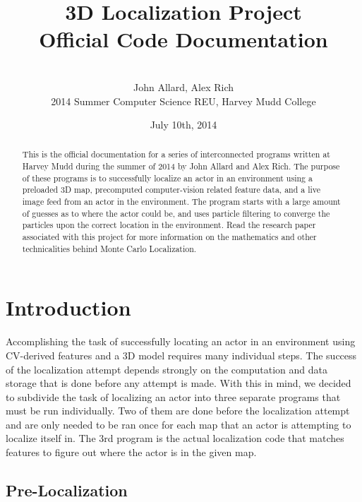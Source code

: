\documentclass[a4paper,11pt]{article}
\title{3D Localization Project \\ Official Code Documentation}
\author{ \\[6.5in]  John Allard, Alex Rich \\ 2014 Summer Computer Science REU, Harvey Mudd College}
\date{July 10th, 2014}
\begin{document}
  \maketitle
  
  \newpage

    \begin{abstract}
    This is the official documentation for a series of interconnected programs written at Harvey Mudd during the summer of 2014 by John Allard and Alex Rich. The purpose of these programs is to successfully localize an actor in an environment using a preloaded 3D map, precomputed computer-vision related feature data, and a live image feed from an actor in the environment. The program starts with a large amount of guesses as to where the actor could be, and uses particle filtering to converge the particles upon the correct location in the environment. Read the research paper associated with this project for more information on the mathematics and other technicalities behind Monte Carlo Localization.
    \end{abstract}
    
    \tableofcontents
    \newpage

    \section{Introduction}
    Accomplishing the task of successfully locating an actor in an environment using CV-derived features and a 3D model requires many individual steps. The success of the localization attempt depends strongly on the computation and data storage that is done before any attempt is made. With this in mind, we decided to subdivide the task of localizing an actor into three separate programs that must be run individually. Two of them are done before the localization attempt and are only needed to be ran once for each map that an actor is attempting to localize itself in. The 3rd program is the actual localization code that matches features to figure out where the actor is in the given map.

        \subsection{Pre-Localization}
\end{document}
